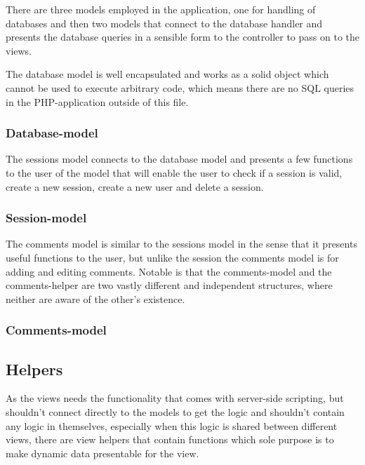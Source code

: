 \documentclass[a4paper]{scrartcl}
\begin{document}
There are three models employed in the application, one for handling of databases and then two models that connect to the database handler and presents the database queries in a sensible form to the controller to pass on to the views.

The database model is well encapsulated and works as a solid object which cannot be used to execute arbitrary code, which means there are no SQL queries in the PHP-application outside of this file.

\subsubsection{Database-model}
\label{subsub:databasemodel}


The sessions model connects to the database model and presents a few functions to the user of the model that will enable the user to check if a session is valid, create a new session, create a new user and delete a session.

\subsubsection{Session-model}
\label{subsub:sessionmodel}


The comments model is similar to the sessions model in the sense that it presents useful functions to the user, but unlike the session the comments model is for adding and editing comments. Notable is that the comments-model and the comments-helper are two vastly different and independent structures, where neither are aware of the other's existence.

\subsubsection{Comments-model}
\label{subsub:commentmodel}


\newpage
\subsection{Helpers}

As the views needs the functionality that comes with server-side scripting, but shouldn't connect directly to the models to get the logic and shouldn't contain any logic in themselves, especially when this logic is shared between different views, there are view helpers that contain functions which sole purpose is to make dynamic data presentable for the view.
\end{document}
